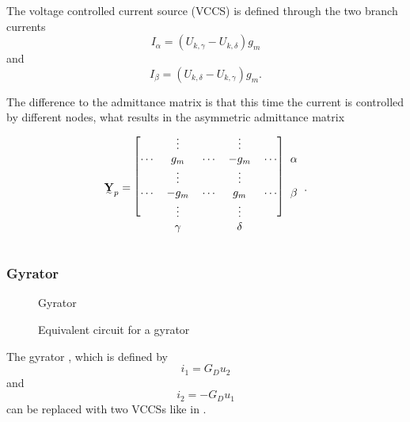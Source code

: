 The voltage controlled current source (VCCS) is defined through the two branch currents
\begin{equation}
	I_\alpha = (U_{k,\gamma} - U_{k,\delta}) g_m
\end{equation}
and
\begin{equation}
	I_\beta = (U_{k,\delta} - U_{k,\gamma}) g_m.
\end{equation}

The difference to the admittance matrix is that this time the current is controlled by different nodes, what results in the asymmetric admittance matrix
\begin{equation}
	\mat Y_p = 	
	\begin{blockarray}{cccccc}
		\begin{block}{[ccccc]c}
		 		& \vdots	&			& \vdots	&			& \\
		\cdots	& g_m		& \cdots	& -g_m		& \cdots	& \alpha \\
		 		& \vdots	&			& \vdots	&			& \\
		\cdots	& -g_m		& \cdots	& g_m		& \cdots	& \beta \\
		 		& \vdots	&			& \vdots	&			& \\
		\end{block}
				& \gamma	&			& \delta	&			& 
	\end{blockarray}.
\end{equation}

\subsubsection{Gyrator}

\begin{figure}
	\centering
	
	\caption{Gyrator}
	\label{fig:gyrator_original}
\end{figure}

\begin{figure}
	\centering
	
	\caption{Equivalent circuit for a gyrator}
	\label{fig:gyrator_equivalent}
\end{figure}

The gyrator , which is defined by
\begin{equation}
	i_1 = G_D u_2
\end{equation}
and
\begin{equation}
	i_2 = -G_D u_1
\end{equation}
can be replaced with two VCCSs like in .

